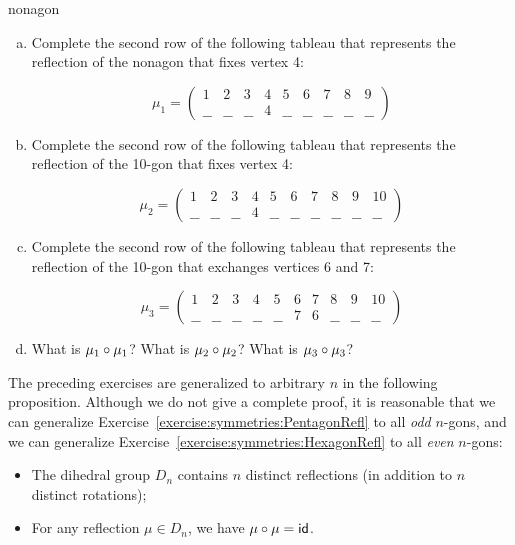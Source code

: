\begin{exercise}{nonagon}
\begin{enumerate}[(a)]
\item 
Complete the second row of the following tableau that represents the reflection of the nonagon that fixes vertex 4:

$$\mu_1 = \begin{pmatrix} 1 & 2 & 3 & 4 & 5 & 6 & 7 & 8 & 9 \\ \_\_ & \_\_ & \_\_ & 4 & \_\_ & \_\_ & \_\_ & \_\_ & \_\_   \end{pmatrix}$$

\item
Complete the second row of the following tableau that represents the reflection of the 10-gon that fixes vertex 4:

$$\mu_2 = \begin{pmatrix} 1 & 2 & 3 & 4 & 5 & 6 & 7 & 8 & 9 & 10  \\ \_\_ & \_\_ & \_\_ & 4 & \_\_ & \_\_ & \_\_ & \_\_ & \_\_ & \_\_   \end{pmatrix}$$


\item 
Complete the second row of the following tableau that represents the reflection of the 10-gon that exchanges vertices 6 and 7:

$$\mu_3 = \begin{pmatrix} 1 & 2 & 3 & 4 & 5 & 6 & 7 & 8 & 9 & 10 \\ \_\_ & \_\_ & \_\_  & \_\_ & \_\_ & 7 & 6 & \_\_ & \_\_ & \_\_  \end{pmatrix}$$

\item
What is $\mu_1 \circ \mu_1$? What is $\mu_2 \circ \mu_2$? What is $\mu_3 \circ \mu_3$?
\end{enumerate}
\end{exercise}

The preceding exercises are generalized to arbitrary $n$ in the following proposition. Although we do not give a complete proof, it is reasonable that we can generalize Exercise~\ref{exercise:symmetries:PentagonRefl} to all \emph{odd} $n$-gons, and we can  generalize Exercise~\ref{exercise:symmetries:HexagonRefl} to all \emph{even} $n$-gons:

\begin{prop}{}
\begin{itemize}
\item
The dihedral group $D_n$ contains $n$ distinct reflections (in addition to $n$ distinct rotations);
\item
For any reflection $\mu \in D_n$, we have $\mu \circ \mu = {\sf{i}d}$.
\end{itemize}
\end{prop}

